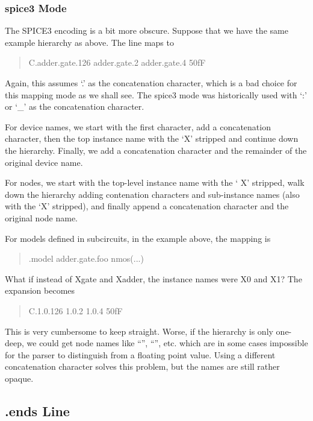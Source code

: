 \subsubsection{{\vt spice3} Mode}

The SPICE3 encoding is a bit more obscure.  Suppose that we have the
same example hierarchy as above.  The line maps to
\begin{quote}\vt
C.adder.gate.126 adder.gate.2 adder.gate.4 50fF
\end{quote}

Again, this assumes `{\vt .}' as the concatenation character, which is
a bad choice for this mapping mode as we shall see.  The {\vt spice3}
mode was historically used with `{\vt :}' or `{\vt \_}' as the
concatenation character.

For device names, we start with the first character, add a
concatenation character, then the top instance name with the `{\vt X}'
stripped and continue down the hierarchy.  Finally, we add a
concatenation character and the remainder of the original device name.

For nodes, we start with the top-level instance name with the `{\vt
X}' stripped, walk down the hierarchy adding contenation characters
and sub-instance names (also with the `{\vt X}' stripped), and finally
append a concatenation character and the original node name.

For models defined in subcircuits, in the example above, the mapping
is
\begin{quote}\vt
.model adder.gate.foo nmos(...)
\end{quote}

What if instead of {\vt Xgate} and {\vt Xadder}, the instance names
were {\vt X0} and {\vt X1}?  The expansion becomes
\begin{quote}\vt
C.1.0.126 1.0.2 1.0.4 50fF
\end{quote}

This is very cumbersome to keep straight.  Worse, if the hierarchy is
only one-deep, we could get node names like ``{}'', ``{}'', etc.  which are in some cases impossible for the parser to
distinguish from a floating point value.  Using a different
concatenation character solves this problem, but the names are still
rather opaque.

\subsection{{\vt .ends} Line}

